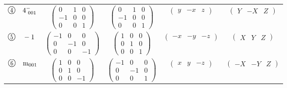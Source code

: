 \documentclass[fleqn,10pt,landscape]{jsarticle}
\begin{document}
\begin{center}
\begin{longtable}{lcccc}
$ {\ooalign{\hfil\resizebox{.8\width}{\height}{4}\hfil\crcr\raise.1ex\hbox{\large$\bigcirc$}}}\quad 4^{-}_{\,\,001} $ & $ \begin{pmatrix} 0 & 1 & 0 \\ -1 & 0 & 0 \\ 0 & 0 & 1 \end{pmatrix} $ & $ \begin{pmatrix} 0 & 1 & 0 \\ -1 & 0 & 0 \\ 0 & 0 & 1 \end{pmatrix} $ & $ \begin{pmatrix} y & - x & z \end{pmatrix} $ & $ \begin{pmatrix} Y & - X & Z \end{pmatrix} $ \\
$ {\ooalign{\hfil\resizebox{.8\width}{\height}{5}\hfil\crcr\raise.1ex\hbox{\large$\bigcirc$}}}\quad -1 $ & $ \begin{pmatrix} -1 & 0 & 0 \\ 0 & -1 & 0 \\ 0 & 0 & -1 \end{pmatrix} $ & $ \begin{pmatrix} 1 & 0 & 0 \\ 0 & 1 & 0 \\ 0 & 0 & 1 \end{pmatrix} $ & $ \begin{pmatrix} - x & - y & - z \end{pmatrix} $ & $ \begin{pmatrix} X & Y & Z \end{pmatrix} $ \\
$ {\ooalign{\hfil\resizebox{.8\width}{\height}{6}\hfil\crcr\raise.1ex\hbox{\large$\bigcirc$}}}\quad {\rm m}_{001} $ & $ \begin{pmatrix} 1 & 0 & 0 \\ 0 & 1 & 0 \\ 0 & 0 & -1 \end{pmatrix} $ & $ \begin{pmatrix} -1 & 0 & 0 \\ 0 & -1 & 0 \\ 0 & 0 & 1 \end{pmatrix} $ & $ \begin{pmatrix} x & y & - z \end{pmatrix} $ & $ \begin{pmatrix} - X & - Y & Z \end{pmatrix} $ \\

\end{longtable}
\end{center}
\end{document}
